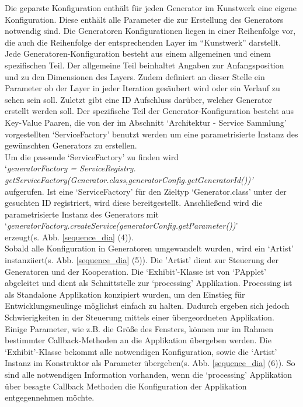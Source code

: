 \documentclass[../mciAusarbeitung.tex]{subfiles}
\begin{document}
	Die geparste Konfiguration enthält für jeden Generator im Kunstwerk eine eigene Konfiguration. Diese enthält alle Parameter die zur Erstellung des Generators notwendig sind. Die Generatoren Konfigurationen liegen in einer Reihenfolge vor, die auch die Reihenfolge der entsprechenden Layer im ``Kunstwerk'' darstellt.
	Jede Generatoren-Konfiguration besteht aus einem allgemeinen und einem spezifischen Teil. Der allgemeine Teil beinhaltet Angaben zur Anfangsposition und zu den Dimensionen des Layers. Zudem definiert an dieser Stelle ein Parameter ob der Layer in jeder Iteration gesäubert wird oder ein Verlauf zu sehen sein soll. Zuletzt gibt eine ID Aufschluss darüber, welcher Generator erstellt werden soll.
	Der spezifische Teil der Generator-Konfiguration besteht aus Key-Value Paaren, die von der im Abschnitt `Architektur - Service Sammlung' vorgestellten `ServiceFactory' benutzt werden um eine parametrisierte Instanz des gewünschten Generators zu erstellen.\\
	Um die passende `ServiceFactory' zu finden wird  \\`\textit{\indent generatorFactory = ServiceRegistry.\\
	\indent\indent getServiceFactory(Generator.class,generatorConfig.getGeneratorId())'}\\
	aufgerufen. Ist eine `ServiceFactory' für den Zieltyp `Generator.class' unter der gesuchten ID registriert, wird diese bereitgestellt. Anschließend wird die parametrisierte Instanz des Generators mit\\ \indent `\textit{generatorFactory.createService(generatorConfig.getParameter())}' \\
	erzeugt(s. Abb. \ref{sequence_dia} (4)). \\
	Sobald alle Konfiguration in Generatoren umgewandelt wurden, wird ein `Artist' instanziiert(s. Abb. \ref{sequence_dia} (5)). Die 'Artist' dient zur Steuerung der Generatoren und der Kooperation. 
	Die `Exhibit'-Klasse ist von `PApplet' abgeleitet und dient als Schnittstelle zur `processing' Applikation. Processing ist als Standalone Applikation konzipiert wurden, um den Einstieg für Entwicklungsneulinge möglichst einfach zu halten. Dadurch ergeben sich jedoch Schwierigkeiten in der Steuerung mittels einer übergeordneten Applikation. Einige Parameter, wie z.B. die Größe des Fensters, können nur im Rahmen bestimmter Callback-Methoden an die Applikation übergeben werden.
	Die `Exhibit'-Klasse bekommt alle notwendigen Konfiguration, sowie die `Artist' Instanz im Konstruktor als Parameter übergeben(s. Abb. \ref{sequence_dia} (6)). So sind alle notwendigen Information vorhanden, wenn die `processing' Applikation über besagte Callback Methoden die Konfiguration der Applikation entgegennehmen möchte.
\end{document}
